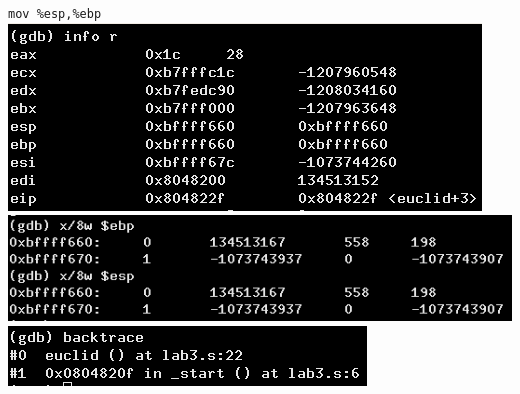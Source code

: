 \documentclass{article}
\begin{document}
\begin{minipage}{8cm}
\verb|mov %esp,%ebp|\\
\includegraphics[scale=0.4]{info6.png} \\
\includegraphics[scale=0.4]{x6.png} \\
\includegraphics[scale=0.5]{bt6.png} \\
\end{minipage}
\clearpage
\end{document}
